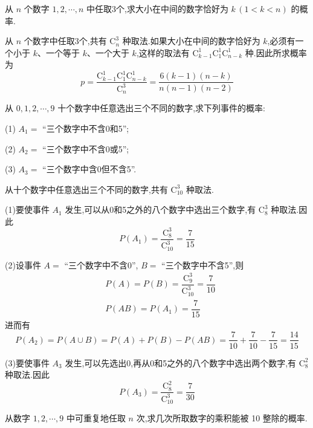 \question 从 $n$ 个数字 $1,2,\cdots,n$ 中任取3个,求大小在中间的数字恰好为 $k \, (1 < k < n)$ 的概率.

\begin{solution}
    从 $n$ 个数字中任取3个,共有 $\mathrm{C}_{n}^3$ 种取法.如果大小在中间的数字恰好为 $k$,必须有一个小于 $k$、一个等于 $k$、一个大于 $k$,这样的取法有 $\mathrm{C}_{k-1}^1 \mathrm{C}_1^1 \mathrm{C}_{n-k}^1$ 种.因此所求概率为
    $$
    p = \dfrac{\mathrm{C}_{k-1}^1 \mathrm{C}_1^1 \mathrm{C}_{n-k}^1}{\mathrm{C}_{n}^3} = \dfrac{6(k-1)(n-k)}{n(n-1)(n-2)}
    $$
\end{solution}

\question 从 $0, 1, 2, \cdots, 9$ 十个数字中任意选出三个不同的数字,求下列事件的概率:

(1) $A_1=$ ``三个数字中不含0和5'';

(2) $A_2=$ ``三个数字中不含0或5'';

(3) $A_3=$ ``三个数字中含0但不含5''.

\begin{solution}
    从十个数字中任意选出三个不同的数字,共有 $\mathrm{C}_{10}^3$ 种取法.

    (1)要使事件 $A_1$ 发生,可以从0和5之外的八个数字中选出三个数字,有 $\mathrm{C}_8^3$ 种取法.因此
    $$
    P(A_1) = \dfrac{\mathrm{C}_8^3}{\mathrm{C}_{10}^3} = \dfrac{7}{15}
    $$

    (2)设事件 $A=$ ``三个数字中不含0'', $B=$ ``三个数字中不含5'',则
    $$
    \begin{aligned}
        & P(A) = P(B) = \dfrac{\mathrm{C}_9^3}{\mathrm{C}_{10}^3} = \dfrac{7}{10} \\
        & P(AB) = P(A_1) = \dfrac{7}{15}
    \end{aligned}
    $$
    进而有
    $$
    P(A_2) = P(A \cup B) = P(A) + P(B) - P(AB) = \dfrac{7}{10} + \dfrac{7}{10} - \dfrac{7}{15} = \dfrac{14}{15}
    $$

    (3)要使事件 $A_3$ 发生,可以先选出0,再从0和5之外的八个数字中选出两个数字,有 $\mathrm{C}_8^2$ 种取法.因此
    $$
    P(A_3) = \dfrac{\mathrm{C}_8^2}{\mathrm{C}_{10}^3} = \dfrac{7}{30}
    $$
\end{solution}

\question 从数字 $1, 2, \cdots, 9$ 中可重复地任取 $n$ 次,求几次所取数字的乘积能被 10 整除的概率.

